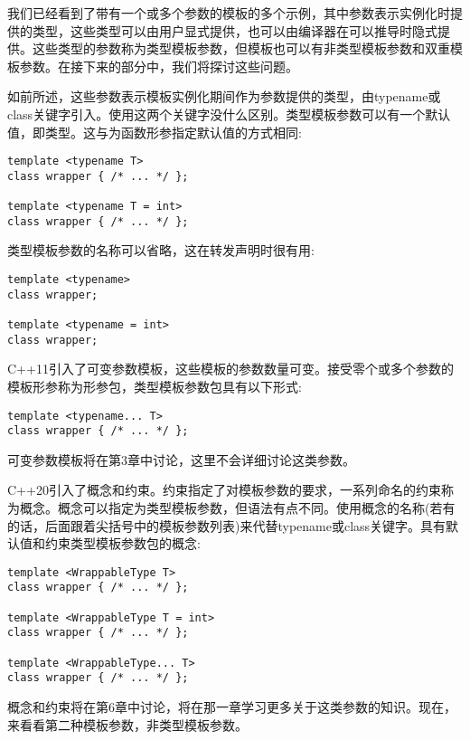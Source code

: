 
我们已经看到了带有一个或多个参数的模板的多个示例，其中参数表示实例化时提供的类型，这些类型可以由用户显式提供，也可以由编译器在可以推导时隐式提供。这些类型的参数称为类型模板参数，但模板也可以有非类型模板参数和双重模板参数。在接下来的部分中，我们将探讨这些问题。


如前所述，这些参数表示模板实例化期间作为参数提供的类型，由typename或class关键字引入。使用这两个关键字没什么区别。类型模板参数可以有一个默认值，即类型。这与为函数形参指定默认值的方式相同:

\begin{lstlisting}[style=styleCXX]
template <typename T>
class wrapper { /* ... */ };

template <typename T = int>
class wrapper { /* ... */ };
\end{lstlisting}

类型模板参数的名称可以省略，这在转发声明时很有用:

\begin{lstlisting}[style=styleCXX]
template <typename>
class wrapper;

template <typename = int>
class wrapper;
\end{lstlisting}

C++11引入了可变参数模板，这些模板的参数数量可变。接受零个或多个参数的模板形参称为形参包，类型模板参数包具有以下形式:

\begin{lstlisting}[style=styleCXX]
template <typename... T>
class wrapper { /* ... */ };
\end{lstlisting}

可变参数模板将在第3章中讨论，这里不会详细讨论这类参数。

C++20引入了概念和约束。约束指定了对模板参数的要求，一系列命名的约束称为概念。概念可以指定为类型模板参数，但语法有点不同。使用概念的名称(若有的话，后面跟着尖括号中的模板参数列表)来代替typename或class关键字。具有默认值和约束类型模板参数包的概念:

\begin{lstlisting}[style=styleCXX]
template <WrappableType T>
class wrapper { /* ... */ };

template <WrappableType T = int>
class wrapper { /* ... */ };

template <WrappableType... T>
class wrapper { /* ... */ };
\end{lstlisting}

概念和约束将在第6章中讨论，将在那一章学习更多关于这类参数的知识。现在，来看看第二种模板参数，非类型模板参数。


